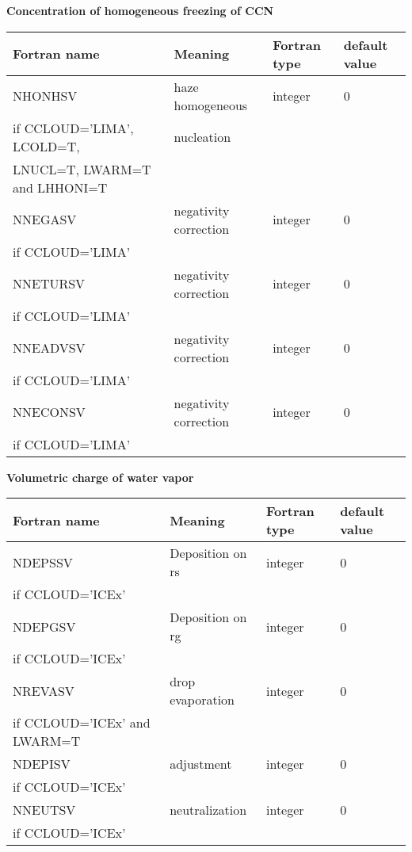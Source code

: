 \textbf{Concentration of homogeneous freezing of CCN}
\begin{longtable} {|p{}|p{}|>{\centering}p{}|p{}<{\centering}|}
\hline
Fortran name & Meaning & Fortran type & default value \\
\hline \hline
\endhead
NHONHSV & haze homogeneous  & integer & 0 \\ \nopagebreak
if CCLOUD='LIMA', LCOLD=T, &nucleation&& \\ \nopagebreak
LNUCL=T, LWARM=T and LHHONI=T &&& \\\hline

NNEGASV   & negativity correction & integer  &  0 \\ \nopagebreak
if CCLOUD='LIMA' &&&\\\hline
NNETURSV  &negativity correction   & integer  &  0 \\ \nopagebreak
if CCLOUD='LIMA' &&&\\\hline
NNEADVSV  & negativity correction  & integer  &  0 \\ \nopagebreak
if CCLOUD='LIMA' &&&\\\hline
NNECONSV  &negativity correction    & integer  &  0 \\ \nopagebreak
if CCLOUD='LIMA' &&&\\\hline
\end{longtable}

\textbf{Volumetric charge of water vapor}
\begin{longtable} {|p{}|p{}|>{\centering}p{}|p{}<{\centering}|}
\hline
Fortran name & Meaning & Fortran type & default value \\
\hline \hline
\endhead
NDEPSSV & Deposition on rs& integer & 0 \\ \nopagebreak
if CCLOUD='ICEx' &&& \\\hline

NDEPGSV & Deposition on rg& integer & 0 \\ \nopagebreak
if CCLOUD='ICEx' &&& \\\hline

NREVASV & drop evaporation & integer & 0 \\ \nopagebreak
if CCLOUD='ICEx' and LWARM=T &&& \\\hline

NDEPISV & adjustment& integer & 0 \\ \nopagebreak
if CCLOUD='ICEx' &&& \\\hline

NNEUTSV & neutralization & integer & 0 \\ \nopagebreak
if CCLOUD='ICEx' &&& \\\hline
\end{longtable}

